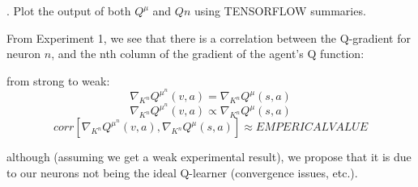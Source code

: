 \documentclass{article} %
\numberwithin{equation}{subsection}
\numberwithin{theorem}{subsection}
\begin{document}
. Plot the output of both $Q^\mu$ and $Qn$ using TENSORFLOW summaries.

From Experiment 1, we see that there is a correlation between the Q-gradient for neuron $n$, and the nth column of the gradient of the agent's Q function:

from strong to weak:
$$\nabla_{K^n} Q^{\mu^n}(v,a) = \nabla_{K^n} Q^{\mu}(s,a)$$
$$\nabla_{K^n} Q^{\mu^n}(v,a) \propto \nabla_{K^n} Q^{\mu}(s,a)$$
$$corr[\nabla_{K^n} Q^{\mu^n}(v,a), \nabla_{K^n} Q^{\mu}(s,a)] \approx EMPERICAL VALUE$$

although (assuming we get a weak experimental result), we propose that it is due to our neurons not being the ideal Q-learner (convergence issues, etc.).

\end{document}

